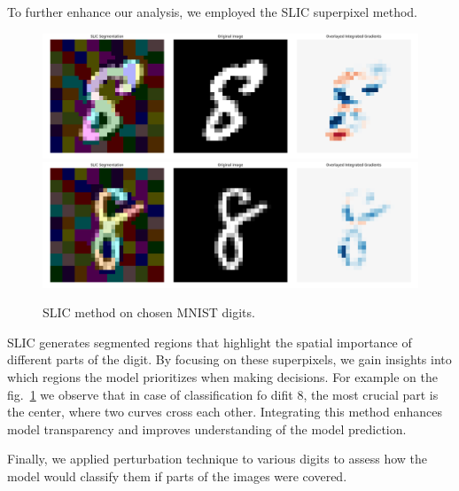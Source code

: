 \documentclass[journal, a4paper]{IEEEtran}
\begin{document}
To further enhance our analysis, we employed the SLIC superpixel method.

\begin{figure}[h]\centering
    \includegraphics[width=.6\linewidth]{img/SLIC/mnist/8}
    \includegraphics[width=.6\linewidth]{img/SLIC/mnist/8_1}
    \caption{SLIC method on chosen MNIST digits.}\label{fig:mnist-cnn-slic}
\end{figure}

SLIC generates segmented regions that highlight the spatial importance of different parts of the digit.
By focusing on these superpixels, we gain insights into which regions the model prioritizes when making decisions.
For example on the fig.~\ref{fig:mnist-cnn-slic} we observe that in case of classification fo difit 8, the most crucial part is the center, where two curves cross each other.
Integrating this method enhances model transparency and improves understanding of the model prediction.

Finally, we applied perturbation technique to various digits to assess how the model would classify them if parts of the images were covered.
\end{document}
